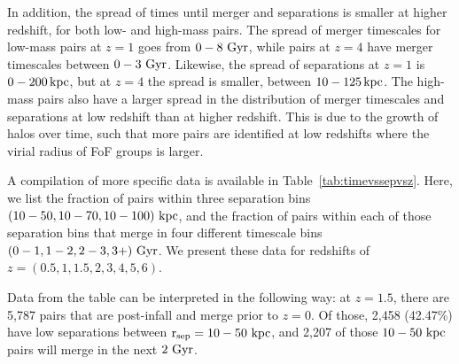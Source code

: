 \documentclass[twocolumn,linenumbers]{aastex631}
\begin{document}
    In addition, the spread of times until merger and separations is smaller at higher redshift, for both low- and high-mass pairs. 
    The spread of merger timescales for low-mass pairs at $z=1$ goes from $0-8\,\mathrm{\,Gyr}$, while pairs at $z=4$ have merger timescales between $0-3\,\mathrm{\,Gyr}$. 
    Likewise, the spread of separations at $z=1$ is $0-200\mathrm{\,kpc}$, but at $z=4$ the spread is smaller, between $10-125\mathrm{\,kpc}$. 
    The high-mass pairs also have a larger spread in the distribution of merger timescales and separations at low redshift than at higher redshift.
    This is due to the growth of halos over time, such that more pairs are identified at low redshifts where the virial radius of FoF groups is larger. 
    
    
    A compilation of more specific data is available in Table~\ref{tab:timevssepvsz}.
    Here, we list the fraction of pairs within three separation bins $(10-50, 10-70, 10-100)\,\mathrm{\,kpc}$, and the fraction of pairs within each of those separation bins that merge in four different timescale bins $(0-1, 1-2, 2-3, 3+)\,\mathrm{\,Gyr}$.
    We present these data for redshifts of $z=(0.5,1,1.5,2,3,4,5,6)$.
    
    Data from the table can be interpreted in the following way: at $z=1.5$, there are 5,787 pairs that are post-infall and merge prior to $z=0$. 
    Of those, 2,458 (42.47\%) have low separations between $\rm r_{sep}=10-50\,\mathrm{\,kpc}$, and 2,207 of those $10-50\,\mathrm{\,kpc}$ pairs will merge in the next $2\,\mathrm{\,Gyr}$. 
    
\end{document}
